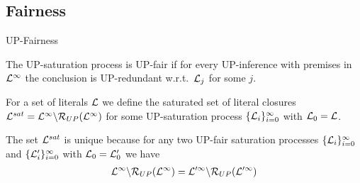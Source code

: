 \documentclass[%
handout,
]{beamer}
\begin{document}
\subsection{Fairness}
\begin{frame}{UP-Fairness}

        The UP-saturation process is {UP-fair} if for every UP-inference
        with premises in \( \mathcal{L}^\infty \) the conclusion is UP-redundant
        w.r.t.~\(\mathcal{L}_j\) for some \(j\).

        For a set of literals \( \mathcal{L} \) we define
        the saturated set of literal closures
        \( \mathcal{L}^{sat} = \mathcal{L}^\infty\backslash\mathcal{R}_{UP}(\mathcal{L}^\infty) \)
        for some UP-saturation process
        \( \{ \mathcal{L}_i\}_{i=0}^\infty \)
        with $\mathcal{L}_0 = \mathcal{L}$.

        \vspace{1.4em}

    \begin{lemma}
        The set \( \mathcal{L}^{sat} \) is unique because
        for any two UP-fair saturation processes
        \(\{ \mathcal{L}_i
            \}_{i=0}^\infty\) and
            \(\{ \mathcal{L}'_i
            \}_{i=0}^\infty\)
            with $\mathcal{L}_0 = \mathcal{L}'_0$ we have
            \begin{gather*}
                \mathcal{L}^\infty \backslash \mathcal{R}_{UP}(\mathcal{L}^\infty)
                =
                \mathcal{L}'^\infty \backslash \mathcal{R}_{UP}(\mathcal{L}'^\infty)
            \end{gather*}
    \end{lemma}
\end{frame}


\end{document}
